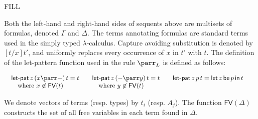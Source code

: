 \begin{entry}{FILL}
\begin{calculus}
\end{calculus}


\begin{clarifications}
Both the left-hand and right-hand sides of sequents above are
multisets of formulas, denoted $\Gamma$ and $\Delta$.  The terms
annotating formulas are standard terms used in the simply typed
$\lambda$-calculus.  Capture avoiding substitution is denoted by
$[t/x]t'$, and uniformly replaces every occurrence of $x$ in $t'$ with
$t$.  The definition of the let-pattern function used in the rule
$\parr_L$ is defined as follows:
\begin{center}
    \begin{math}
      \begin{array}{lll}      
        \begin{array}{lll}
          \letpat{z}{(x \parr -)}{t} = t\\
          \,\,\,\,\,\,\mbox{where } x \not\in \mathsf{FV}(t)\\
        \end{array}
        & 
          \begin{array}{lll}
            \letpat{z}{(- \parr y)}{t} = t\\
        \,\,\,\,\,\,\mbox{where } y \not\in \mathsf{FV}(t)\\
          \end{array}
        & 
          \begin{array}{lll}
            \letpat{z}{p}{t} = \letbe{z}{p}{t}\\
            & \\
          \end{array}
      \end{array}
    \end{math}
\end{center}
We denote vectors of terms (resp. types) by $t_i$ (resp. $A_j$).  The
function $\mathsf{FV}(\Delta)$ constructs the set of all free
variables in each term found in $\Delta$.
\end{clarifications}


\end{entry}
